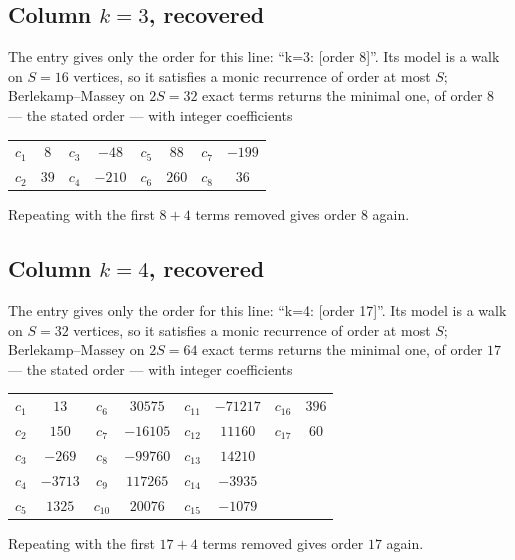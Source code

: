 \documentclass[11pt,a4paper]{article}
\theoremstyle{plain}
\theoremstyle{definition}
\begin{document}
\subsection*{Column $k=3$, recovered}
The entry gives only the order for this line: ``k=3: [order 8]''. Its model is a walk on
$S=16$ vertices, so it satisfies a monic recurrence of order at most $S$;
Berlekamp--Massey on $2S=32$ exact terms returns the minimal one, of order
$8$ --- the stated order --- with integer coefficients
\begin{center}\small\begin{tabular}{cccccccc}
$c_{1}$ & $8$ & $c_{3}$ & $-48$ & $c_{5}$ & $88$ & $c_{7}$ & $-199$ \\
$c_{2}$ & $39$ & $c_{4}$ & $-210$ & $c_{6}$ & $260$ & $c_{8}$ & $36$ \\
\end{tabular}\end{center}
Repeating with the first $8+4$ terms removed gives order $8$ again.

\subsection*{Column $k=4$, recovered}
The entry gives only the order for this line: ``k=4: [order 17]''. Its model is a walk on
$S=32$ vertices, so it satisfies a monic recurrence of order at most $S$;
Berlekamp--Massey on $2S=64$ exact terms returns the minimal one, of order
$17$ --- the stated order --- with integer coefficients
\begin{center}\small\begin{tabular}{cccccccc}
$c_{1}$ & $13$ & $c_{6}$ & $30575$ & $c_{11}$ & $-71217$ & $c_{16}$ & $396$ \\
$c_{2}$ & $150$ & $c_{7}$ & $-16105$ & $c_{12}$ & $11160$ & $c_{17}$ & $60$ \\
$c_{3}$ & $-269$ & $c_{8}$ & $-99760$ & $c_{13}$ & $14210$ &  &  \\
$c_{4}$ & $-3713$ & $c_{9}$ & $117265$ & $c_{14}$ & $-3935$ &  &  \\
$c_{5}$ & $1325$ & $c_{10}$ & $20076$ & $c_{15}$ & $-1079$ &  &  \\
\end{tabular}\end{center}
Repeating with the first $17+4$ terms removed gives order $17$ again.
\end{document}
